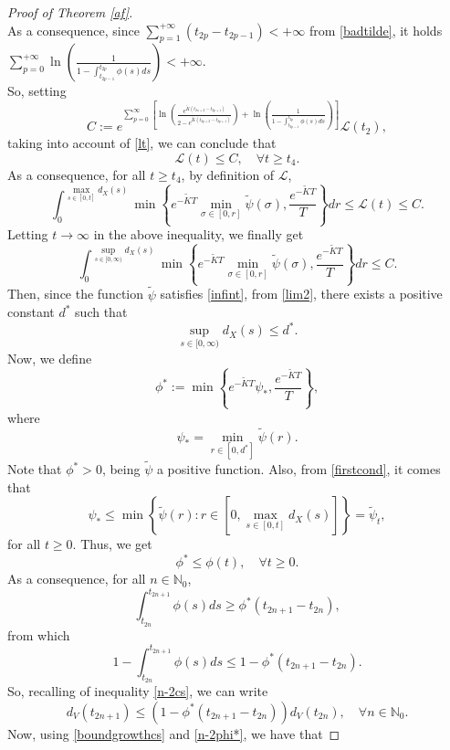 \documentclass[a4paper,11pt,oneside]{article}
\begin{document}
\begin{proof}[Proof of Theorem \ref{af}]
$$$$
	As a consequence, since $\sum_{p=1}^{+\infty}(t_{2p}-t_{2p-1})<+\infty$ from \eqref{badtilde}, it holds $\sum_{p=0}^{+\infty}\ln\left(\frac{1}{1-\int_{t_{2p-1}}^{t_{2p}}\phi(s)ds}\right)<+\infty$.
	\\So, setting $$C:=e^{\sum_{p=0}^{\infty}\left[\ln\left(\frac{e^{\tilde K(t_{2n+2}-t_{2p+1})}}{2-e^{\tilde K(t_{2p+2}-t_{2p+1})}}\right)+\ln\left(\frac{1}{1-\int_{t_{2p-1}}^{t_{2p}}\phi(s)ds}\right)\right]}\mathcal{L}(t_2),$$
	taking into account of \eqref{lt}, we can conclude that
	\begin{equation}\label{lia5}
		\mathcal{L}(t)\leq C,\quad \forall t\geq t_4.
	\end{equation}
	As a consequence, for all $t\geq t_4$, by definition of $\mathcal{L}$,
	$$\int_{0}^{\underset{s\in [0,t]}{\max}d_{X}(s)}\min\left\{e^{-\tilde KT}\min_{\sigma\in [0,r]}\tilde\psi(\sigma),\frac{e^{-\tilde KT}}{T}\right\}dr\leq \mathcal{L}(t)\leq C.$$ 
	Letting $t\to \infty$ in the above inequality, we finally get \begin{equation}\label{lim2}
		\int_{0}^{\underset{s\in [0,\infty)}{\sup}d_{X}(s)}\min\left\{e^{-\tilde KT}\min_{\sigma\in [0,r]}\tilde\psi(\sigma),\frac{e^{-\tilde KT}}{T}\right\}dr\leq C.
	\end{equation} 
	Then, since the function $\tilde \psi$ satisfies  \eqref{infint}, from \eqref{lim2}, there exists a positive constant $d^{*}$ such that \begin{equation}\label{firstcond}
		\underset{s\in [0,\infty)}{\sup}d_{X}(s)\leq d^{*}.
	\end{equation}
	Now, we define
	$$\phi^{*}:=\min\left\{e^{-\tilde KT}\psi_{*},\frac{e^{-\tilde KT}}{T}\right\},$$
	where $$\psi_{*}=\min_{r\in[0,d^{*}]}\tilde\psi(r).$$
	Note that $\phi^{*}>0$, being $\tilde\psi$ a positive function. Also, from \eqref{firstcond}, it comes that $$\psi_{*}\leq \min\left\{\tilde\psi(r):r\in \left[0,\max_{s\in [0,t]}d_{X}(s)\right]\right\}=\tilde\psi_{t},$$
	for all $t\geq 0$. Thus, we get $$\phi^{*}\leq \phi(t), \quad \forall t\geq 0.$$
	As a consequence, for all $n\in \mathbb{N}_0$, $$\int_{t_{2n}}^{t_{2n+1}}\phi(s)ds\geq \phi^*(t_{2n+1}-t_{2n}),$$
	from which 
	$$1-\int_{t_{2n}}^{t_{2n+1}}\phi(s)ds\leq 1-\phi^*(t_{2n+1}-t_{2n}).$$
	So, recalling of inequality \eqref{n-2cs}, we can write
	\begin{equation}\label{n-2phi*}
		d_V(t_{2n+1})\leq \left(1-\phi^*(t_{2n+1}-t_{2n})\right)d_V(t_{2n}),\quad\forall n \in \mathbb{N}_0.
	\end{equation}
	Now, using \eqref{boundgrowthcs} and \eqref{n-2phi*}, we have that

\end{proof}
\end{document}
